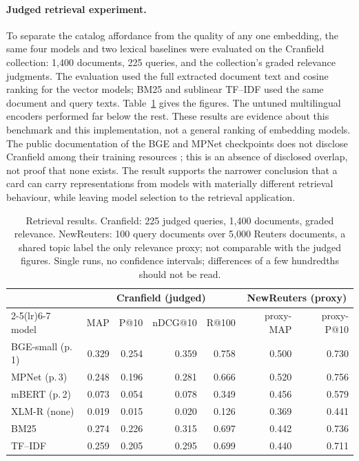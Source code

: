 \documentclass[sigconf]{acmart}
\begin{document}
\paragraph{Judged retrieval experiment.} To separate the catalog affordance
from the quality of any one embedding, the same four models and two lexical
baselines were evaluated on the Cranfield collection: 1,400 documents, 225
queries, and the collection's graded relevance judgments. The evaluation used
the full extracted document text and cosine ranking for the vector models;
BM25 and sublinear TF--IDF used the same document and query texts.
Table~\ref{tab:results} gives the figures. The untuned multilingual encoders
performed far below the rest. These results are evidence about this
benchmark and this implementation, not a general ranking of embedding
models. The public documentation of the BGE and MPNet checkpoints does not
disclose Cranfield among their training resources \cite{BAAI:2023,Reimers:2021};
this is an absence of disclosed overlap, not proof that none exists. The
result supports the narrower conclusion that a card can carry
representations from models with materially different retrieval behaviour,
while leaving model selection to the retrieval application.

\begin{table}[t]
\caption{Retrieval results. Cranfield: 225 judged queries, 1,400 documents,
graded relevance. NewReuters: 100 query documents over 5,000 Reuters
documents, a shared topic label the only relevance proxy; not comparable with
the judged figures. Single runs, no confidence intervals; differences of a
few hundredths should not be read.}
\label{tab:results}
\footnotesize
\setlength{\tabcolsep}{2.4pt}
\begin{tabular}{@{}lrrrrrr@{}}
\toprule
 & \multicolumn{4}{c}{Cranfield (judged)} & \multicolumn{2}{c}{NewReuters (proxy)} \\
\cmidrule(lr){2-5}\cmidrule(lr){6-7}
model & MAP & P@10 & nDCG@10 & R@100 & proxy-MAP & proxy-P@10 \\
\midrule
BGE-small (p.\,1) & 0.329 & 0.254 & 0.359 & 0.758 & 0.500 & 0.730 \\
MPNet (p.\,3)     & 0.248 & 0.196 & 0.281 & 0.666 & 0.520 & 0.756 \\
mBERT (p.\,2)     & 0.073 & 0.054 & 0.078 & 0.349 & 0.456 & 0.579 \\
XLM-R (none)      & 0.019 & 0.015 & 0.020 & 0.126 & 0.369 & 0.441 \\
BM25                  & 0.274 & 0.226 & 0.315 & 0.697 & 0.442 & 0.736 \\
TF--IDF               & 0.259 & 0.205 & 0.295 & 0.699 & 0.440 & 0.711 \\
\bottomrule
\end{tabular}
\end{table}
\end{document}
